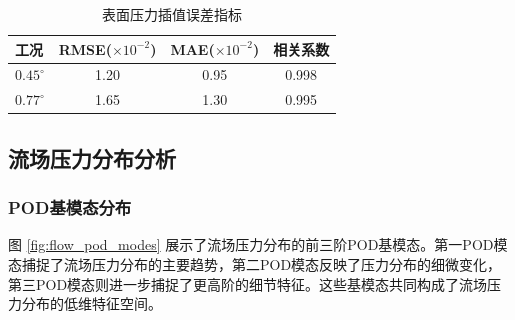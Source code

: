 \begin{table}[H]
    \centering
    \caption{表面压力插值误差指标}
    \label{tab:surface_error}
    \begin{tabular}{lccc}
        \toprule
        工况 & RMSE($\times10^{-2}$) & MAE($\times10^{-2}$) & 相关系数 \\
        \midrule
        $0.45^\circ$ & 1.20 & 0.95 & 0.998 \\
        $0.77^\circ$ & 1.65 & 1.30 & 0.995 \\
        \bottomrule
    \end{tabular}
\end{table}

\subsection{流场压力分布分析}

\subsubsection{POD基模态分布}

图 \ref{fig:flow_pod_modes} 展示了流场压力分布的前三阶POD基模态。第一POD模态捕捉了流场压力分布的主要趋势，第二POD模态反映了压力分布的细微变化，第三POD模态则进一步捕捉了更高阶的细节特征。这些基模态共同构成了流场压力分布的低维特征空间。

